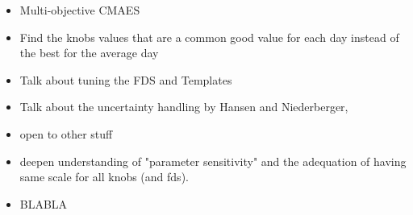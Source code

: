 \begin{itemize}
\item Multi-objective CMAES
\item Find the knobs values that are a common good value for each day instead of the best for the average day
\item Talk about tuning the FDS and Templates
\item Talk about the uncertainty handling by Hansen and Niederberger,
\item open to other stuff
\item deepen understanding of "parameter sensitivity" and the adequation of having same scale for all knobs (and fds).
\item BLABLA
\end{itemize}